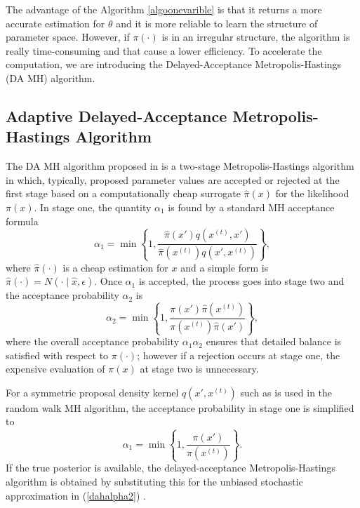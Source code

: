 The advantage of the Algorithm \ref{algoonevarible} is that it returns a more accurate estimation for $\theta$ and it is more reliable to learn the structure of parameter space. However, if $\pi(\cdot)$ is in an irregular structure, the algorithm is really time-consuming and that cause a lower efficiency. To accelerate the computation, we are introducing the Delayed-Acceptance Metropolis-Hastings (DA MH) algorithm.





\subsection{Adaptive Delayed-Acceptance Metropolis-Hastings Algorithm}

The DA MH algorithm proposed in \cite{christen2005markov} is a two-stage Metropolis-Hastings algorithm in which, typically, proposed parameter values are accepted or rejected at the first stage based on a computationally cheap surrogate $\hat{\pi}(x)$ for the likelihood $\pi(x)$. In stage one, the quantity $\alpha_1$ is found by a standard MH acceptance formula 
\begin{equation*}
\alpha_1=\min\left\lbrace  1,\frac{\hat{\pi}(x')q\left(x^{(t)}, x'\right)}{\hat{\pi}(x^{(t)})q\left(x', x^{(t)}\right)}  \right\rbrace ,
\end{equation*}
where $\hat{\pi}(\cdot)$ is a cheap estimation for $x$ and a simple form is $\hat{\pi}(\cdot)=N\left(\cdot\mid \hat{x},\epsilon\right)$. Once $\alpha_1$ is accepted, the process goes into stage two and the acceptance probability $\alpha_2$ is
\begin{equation}\label{dahalpha2}
\alpha_2=\min \left\lbrace  1,\frac{\pi(x')\hat{\pi}\left(x^{(t)}\right) }{\pi\left(x^{(t)}\right)\hat{\pi}(x')} \right\rbrace,
\end{equation}
where the overall acceptance probability $\alpha_1\alpha_2$ ensures that detailed balance is satisfied with respect to $\pi(\cdot)$; however if a rejection occurs at stage one, the expensive evaluation of $\pi(x)$ at stage two is unnecessary.

For a symmetric proposal density kernel $q\left(x', x^{(t)}\right)$ such as is used in the random walk MH algorithm, the acceptance probability in stage one is simplified to
\begin{equation} \label{dahalpha1}
\alpha_1= \min \left\lbrace 1,\frac{\pi(x')}{\pi\left(x^{(t)}\right)}  \right\rbrace.
\end{equation}
If the true posterior is available, the delayed-acceptance Metropolis-Hastings algorithm is obtained by substituting this for the unbiased stochastic approximation in (\ref{dahalpha2}) \cite{sherlock2015efficiency}.


